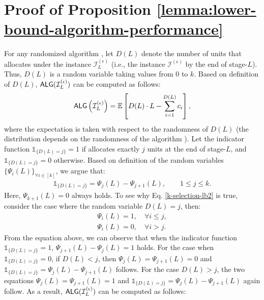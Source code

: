\section{Proof of Proposition \ref{lemma:lower-bound-algorithm-performance}}
\label{appendix:lemma:proof-lower-bound-algorithm-performance}
For any randomized algorithm \ALG, let $D(L)$ denote the number of units that  \ALG allocates under the instance $ \mathcal{I}^{(\epsilon)}_{L} $ (i.e., the instance $\mathcal{I}^{(\epsilon)}$ by the end of stage-$L$). Thus, $D(L)$ is a random variable taking values from $0$ to $k$. Based on definition of $D(L)$, $\textsf{ALG}(\mathcal{I}^{(\epsilon)}_{L})$ can be computed as follows:
\begin{align*}
    \textsf{ALG}\left(\mathcal{I}^{(\epsilon)}_{L}\right) = \mathbb{E} \left[D(L) \cdot L - \sum_{i=1}^{D(L)} c_i \right],
\end{align*}
where the expectation is taken with respect to the randomness of $D(L)$ (the distribution depends on the randomness of the algorithm \ALG). 
Let the indicator function $\mathds{1}_{\{D(L)=j\}} = 1 $  if \ALG allocates exactly $j$ units at the end of stage-$L$, and $\mathds{1}_{\{D(L)=j\}} = 0 $ otherwise.
Based on definition of the random variables ${\{\Psi_i(L)\}}_{\forall i \in [k]}$, we argue that:
\begin{align}
\label{k-selection-lb2}
    {\mathds{1}}_{\{D(L)=j\}} = \Psi_{j}(L) - \Psi_{j+1}(L), \qquad 1 \leq j \leq k.
\end{align}
Here,  $\Psi_{k+1}(L) = 0 $ always holds.  To see why Eq. \eqref{k-selection-lb2} is true, consider the case where the random variable $D(L) = j $, then:
\begin{align*}
    \Psi_i(L) = 1 , \quad \forall i \leq j,\\
    \Psi_i(L) = 0,  \quad \forall i > j.
\end{align*}
From the equation above, we can observe that when the indicator function $\mathds{1}_{\{D(L)=j\}} =  1 $, $\Psi_{j+1}(L) - \Psi_{j}(L) = 1 $ holds. For the case when $\mathds{1}_{\{D(L)=j\}} = 0  $, if $D(L) < j$, then $\Psi_{j}(L) = \Psi_{j+1}(L) = 0$ and $ {\mathds{1}}_{\{D(L)=j\}} = \Psi_{j}(L) - \Psi_{j+1}(L)$ follows. For the case $D(L)>j$, the two equations   $\Psi_{j}(L) = \Psi_{j+1}(L) = 1$ and $ {\mathds{1}}_{\{D(L)=j\}} = \Psi_{j}(L) - \Psi_{j+1}(L)$ again follow.
As a result, $\textsf{ALG}(\mathcal{I}^{(\epsilon)}_{L})$ can be computed as follows:
